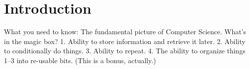 %
%
%
%


\section{Introduction}
What you need to know: The fundamental picture of Computer Science. What's in the magic box? 1. Ability to store information and retrieve it later. 2. Ability to conditionally do things. 3. Ability to repeat. 4. The ability to organize things 1--3 into re-usable bits. (This is a bonus, actually.)

